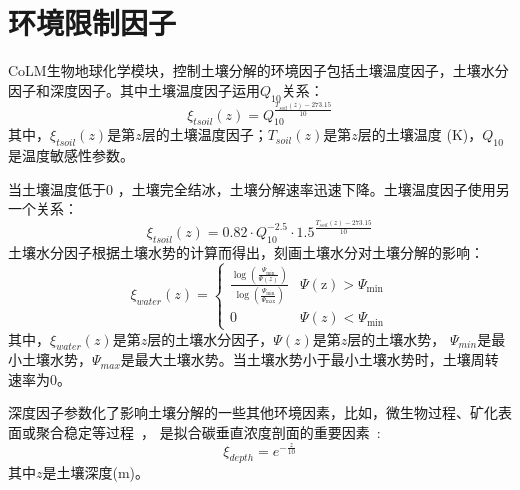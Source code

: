 \section{环境限制因子}\label{环境限制因子}
CoLM生物地球化学模块，控制土壤分解的环境因子包括土壤温度因子，土壤水分因子和深度因子。其中土壤温度因子运用$Q_{10}$关系：
\begin{equation}
\xi_{t s o i l}(z)=Q_{10}^{\frac{T_{{soil }}(z)-273.15}{10}}
\end{equation}
其中，$\xi_{tsoil}\left(z\right)$是第$z$层的土壤温度因子；$T_{soil}\left(z\right)$是第$z$层的土壤温度 (K)，$Q_{10}$是温度敏感性参数。


当土壤温度低于0 \textcelsius，土壤完全结冰，土壤分解速率迅速下降。土壤温度因子使用另一个关系：
\begin{equation}
\xi_{t s o i l}(z)=0.82 \cdot Q_{10}^{-2.5} \cdot 1.5^{\frac{T_{{soil }}(z)-273.15}{10}}
\end{equation}
土壤水分因子根据土壤水势的计算而得出，刻画土壤水分对土壤分解的影响：
\begin{equation}
\xi_{w a t e r}(z)=\begin{cases}
\frac{\log \left(\frac{\Psi_{\min }}{\Psi(z)}\right)}{\log \left(\frac{\Psi_{\min }}{\Psi_{\max }}\right)} 
    & \Psi(\mathrm{z})>\Psi_{\min } \\
0  & \Psi(z)<\Psi_{\min }
\end{cases}
\end{equation}
其中，$\xi_{water}\left(z\right)$是第$z$层的土壤水分因子，$\Psi\left(z\right)$是第$z$层的土壤水势，
$\Psi_{min}$是最小土壤水势，$\Psi_{max}$是最大土壤水势。当土壤水势小于最小土壤水势时，土壤周转速率为0。


深度因子参数化了影响土壤分解的一些其他环境因素，比如，微生物过程、矿化表面或聚合稳定等过程~\citep{koven2013effect}，
是拟合碳垂直浓度剖面的重要因素~\citep{jenkinson2008turnover}:
\begin{equation}
\xi_{d e p t h}=e^{-\frac{z}{10}}
\end{equation}
其中$z$是土壤深度(m)。


